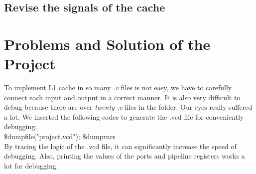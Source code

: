 \documentclass{article}
\begin{document}
\subsection*{Revise the signals of the cache}


\newpage
\section{Problems and Solution of the Project}
To implement L1 cache in so many \textit{.v} files is not easy, 
we have to carefully connect each input and output in a correct manner. 
It is also very difficult to debug because there are over \textit{twenty .v} files in the folder. 
Our eyes really suffered a lot. 
We inserted the following codes to generate the .vcd file for conveniently debugging: \\

\hspace{10mm}\$dumpfile("project.vcd"); \vskip0mm
\hspace{10mm}\$dumpvars \\

By tracing the logic of the .vcd file, it can significantly increase the speed of debugging.
Also, printing the values of the ports and pipeline registers works a lot for debugging.
\end{document}
